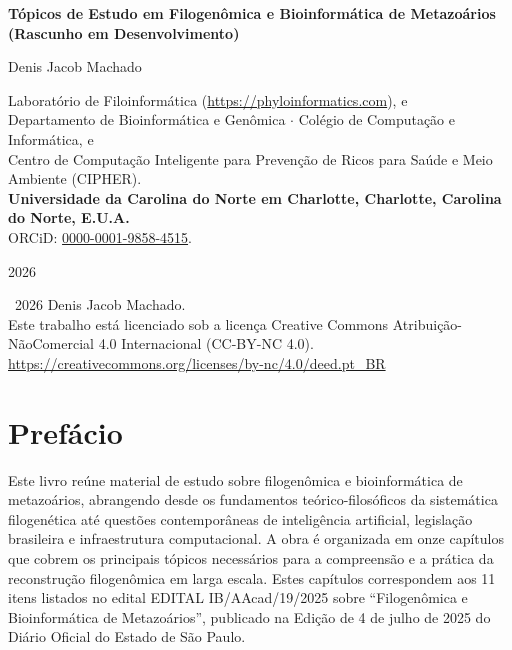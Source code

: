 \documentclass[11pt,a4paper,openright,twoside]{book}
\theoremstyle{definition}
\theoremstyle{plain}
\theoremstyle{remark}
\begin{document}
\frontmatter

\begin{titlepage}
\centering
\vspace*{3cm}
{\Huge\bfseries Tópicos de Estudo em Filogenômica e Bioinformática de Metazoários (Rascunho em Desenvolvimento)\par}
\vspace{1.5cm}
{\Large Denis Jacob Machado\par}
\vspace{0.5cm}
{\scriptsize
    Laboratório de Filoinformática (\url{https://phyloinformatics.com}), e\\
    Departamento de Bioinformática e Genômica $\cdot$ Colégio de Computação e Informática, e\\
    Centro de Computação Inteligente para Prevenção de Ricos para Saúde e Meio Ambiente (CIPHER).\\
    \textbf{Universidade da Carolina do Norte em Charlotte, Charlotte, Carolina do Norte, E.U.A.}\\
    ORCiD: \href{https://orcid.org/0000-0001-9858-4515}{0000-0001-9858-4515}.\\
    \par
}
\vfill
{\large 2026\par}
\end{titlepage}

\newpage
\thispagestyle{empty}
\vspace*{\fill}
\noindent
\textcopyright\ 2026 Denis Jacob Machado.\\[0.5em]
Este trabalho está licenciado sob a licença Creative Commons
Atribuição-NãoComercial 4.0 Internacional (CC-BY-NC 4.0).\\[0.5em]
\url{https://creativecommons.org/licenses/by-nc/4.0/deed.pt_BR}
\vspace{2cm}

\tableofcontents

\chapter{Prefácio}

    Este livro reúne material de estudo sobre filogenômica e bioinformática de metazoários, abrangendo desde os fundamentos teórico-filosóficos da sistemática filogenética até questões contemporâneas de inteligência artificial, legislação brasileira e infraestrutura computacional. A obra é organizada em onze capítulos que cobrem os principais tópicos necessários para a compreensão e a prática da reconstrução filogenômica em larga escala. Estes capítulos correspondem aos 11 itens listados no edital EDITAL IB/AAcad/19/2025 sobre ``Filogenômica e Bioinformática de Metazoários'', publicado na Edição de 4 de julho de 2025 do Diário Oficial do Estado de São Paulo.
\end{document}
